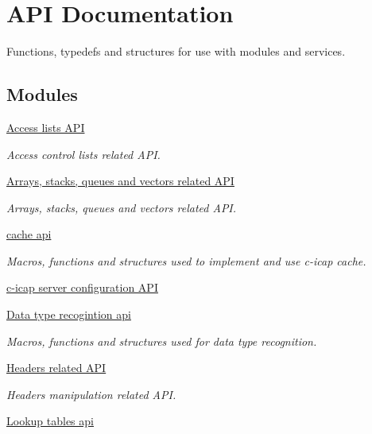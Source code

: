 \hypertarget{group__API}{
\section{API Documentation}
\label{group__API}
}


Functions, typedefs and structures for use with modules and services.  
\subsection*{Modules}
\begin{DoxyCompactItemize}
\item 
\hyperlink{group__ACL}{Access lists API}


\begin{DoxyCompactList}\small\item\em Access control lists related API. \item\end{DoxyCompactList}\item 
\hyperlink{group__ARRAYS}{Arrays, stacks, queues and vectors related API}


\begin{DoxyCompactList}\small\item\em Arrays, stacks, queues and vectors related API. \item\end{DoxyCompactList}\item 
\hyperlink{group__CACHE}{cache api}


\begin{DoxyCompactList}\small\item\em Macros, functions and structures used to implement and use c-\/icap cache. \item\end{DoxyCompactList}\item 
\hyperlink{group__CONFIG}{c-\/icap server configuration API}
\item 
\hyperlink{group__DATATYPE}{Data type recogintion api}


\begin{DoxyCompactList}\small\item\em Macros, functions and structures used for data type recognition. \item\end{DoxyCompactList}\item 
\hyperlink{group__HEADERS}{Headers related API}


\begin{DoxyCompactList}\small\item\em Headers manipulation related API. \item\end{DoxyCompactList}\item 
\hyperlink{group__LOOKUPTABLE}{Lookup tables api}



\end{DoxyCompactItemize}
